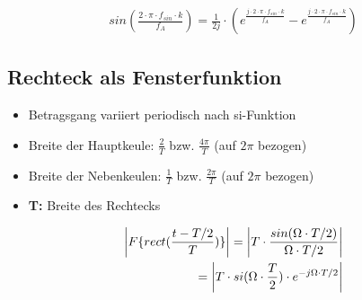 \documentclass[10pt,a4paper]{article}
\begin{document}
\begin{mdframed}[style=exercise]
    \begin{align}
     sin(\frac{2\cdot\pi\cdot f_{sin}\cdot k}{f_{A}}) = \frac{1}{2j}\cdot (e^{\frac{j\cdot 2\cdot\pi\cdot f_{sin}\cdot k}{f_{A}}}-e^{\frac{j\cdot 2\cdot\pi\cdot f_{sin}\cdot k}{f_{A}}})
    \end{align}
\end{mdframed}
\subsection{Rechteck als Fensterfunktion}
\begin{itemize}
    \item Betragsgang variiert periodisch nach si-Funktion
    \item Breite der Hauptkeule: $\frac{2}{T}$ bzw. $\frac{4\pi}{T}$ (auf $2\pi$ bezogen)
    \item Breite der Nebenkeulen: $\frac{1}{T}$ bzw. $\frac{2\pi}{T}$ (auf $2\pi$ bezogen)
    \item \textbf{T:} Breite des Rechtecks
  \end{itemize}
\begin{mdframed}[style=exercise]
    \begin{align}
\abs{F\{rect(\dfrac{t-T/2}{T})\}} = \abs{T \cdot \dfrac{sin(\Omega\cdot T/2)}{\Omega\cdot T/2}}\\
= \abs{T \cdot si(\Omega\cdot\frac{T}{2})\cdot e^{-j\Omega\cdot T / 2}}
    \end{align}
\end{mdframed}
\end{document}
